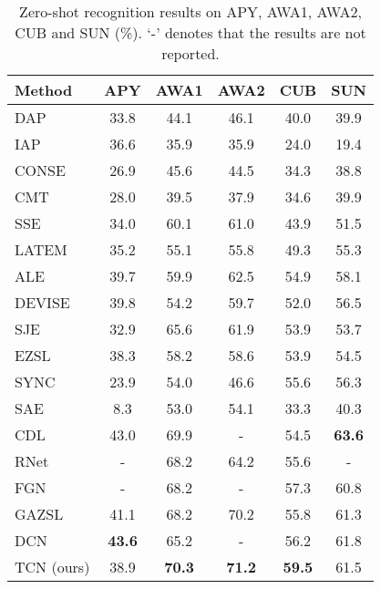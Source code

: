 \documentclass[10pt,twocolumn,letterpaper]{article}
\begin{document}
\begin{table}[t]
\begin{small}
\begin{center}
\begin{tabular}{|l|c|c|c|c|c|}
\hline
\textbf{Method}     &  \textbf{APY }    &  \textbf{AWA1}   &  \textbf{AWA2}  & \textbf{CUB }  &  \textbf{SUN} \\
\hline
\hline
DAP \cite{lampert2009learning}              &   33.8   &   44.1   &   46.1   &   40.0   &   39.9   \\
IAP \cite{lampert2009learning}              &   36.6   &   35.9   &   35.9   &   24.0   &   19.4   \\
CONSE \cite{Norouzi2014ZeroShotLB}          &   26.9   &   45.6   &   44.5   &   34.3   &   38.8   \\
CMT \cite{Socher2013ZeroShotLT}             &   28.0   &   39.5   &   37.9   &   34.6   &   39.9 \\
SSE \cite{Zhang2015ZeroShotLV}              &   34.0   &   60.1   &   61.0   &   43.9   &   51.5   \\
LATEM \cite{Xian2016LatentEF}               &   35.2   &   55.1   &   55.8   &   49.3   &   55.3   \\
ALE \cite{akata2013label}                   &   39.7   &   59.9   &   62.5   &   54.9   &   58.1   \\
DEVISE \cite{frome2013devise}               &   39.8   &   54.2   &   59.7   &   52.0   &   56.5 \\
SJE \cite{akata2015evaluation}              &   32.9   &   65.6   &   61.9   &   53.9   &   53.7   \\
EZSL \cite{romera2015embarrassingly}        &   38.3   &   58.2   &   58.6   &   53.9   &   54.5   \\
SYNC \cite{Changpinyo2016SynthesizedCF}     &   23.9   &   54.0   &   46.6   &   55.6   &   56.3   \\
SAE \cite{Kodirov2017SemanticAF}            &   8.3    &   53.0   &   54.1   &   33.3   &   40.3 \\
CDL \cite{jiang2018learning}                &  43.0   &   69.9   &   -      &   54.5   &   \textbf{63.6} \\
RNet \cite{sung2018learning}                &   -      &   68.2   &   64.2   &   55.6   &   - \\
FGN \cite{xian2018feature}               &   -      &   68.2   &   -   &   57.3   & 60.8 \\
GAZSL \cite{Zhu2018AGA}                		&   41.1   &   68.2   &   70.2   &   55.8   &  61.3 \\
DCN \cite{Liu2018GeneralizedZL}             &    \textbf{43.6}      &  65.2   &   -   &   56.2   & 61.8 \\
\hline
TCN (ours)                                 &   38.9   &   \textbf{70.3}   &   \textbf{71.2}   &   \textbf{59.5}   &   61.5 \\
\hline
\end{tabular}
\end{center}
\end{small}
\caption{
Zero-shot recognition results on APY, AWA1, AWA2, CUB and SUN (\%). `-' denotes that the results are not reported.
}
\label{table:compare}
\end{table}
\end{document}
